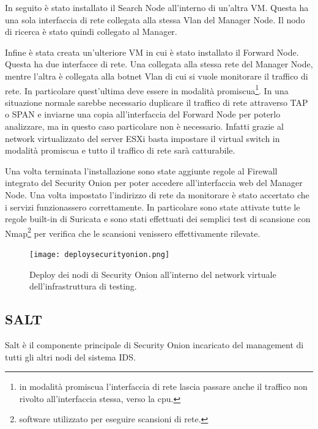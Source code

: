 In seguito è stato installato il Search Node all'interno di un'altra VM. Questa ha una sola interfaccia di rete collegata alla stessa Vlan del Manager Node. Il nodo di ricerca è stato quindi collegato al Manager.

Infine è stata creata un'ulteriore VM in cui è stato installato il Forward Node. Questa ha due interfacce di rete. Una collegata alla stessa rete del Manager Node, mentre l'altra è collegata alla botnet Vlan di cui si vuole monitorare il traffico di rete. In particolare quest'ultima deve essere in modalità promiscua\footnote{in modalità promiscua l'interfaccia di rete lascia passare anche il traffico non rivolto all'interfaccia stessa, verso la cpu.}.
In una situazione normale sarebbe necessario duplicare il traffico di rete attraverso TAP o SPAN e inviarne una copia all'interfaccia del Forward Node per poterlo analizzare, ma in questo caso particolare non è necessario. Infatti grazie al network virtualizzato del server ESXi basta impostare il virtual switch in modalità promiscua e tutto il traffico di rete sarà catturabile.

Una volta terminata l'installazione sono state aggiunte regole al Firewall integrato del Security Onion per poter accedere all'interfaccia web del Manager Node. 
Una volta impostato l'indirizzo di rete da monitorare è stato accertato che i servizi funzionassero correttamente.
In particolare sono state attivate tutte le regole built-in di Suricata e sono stati effettuati dei semplici test di scansione con Nmap\footnote{software utilizzato per eseguire scansioni di rete.} \cite{nmap}  per verifica che le scansioni venissero effettivamente  rilevate.


\begin{figure}[hbtp]
    \centering
    \texttt{[image: deploysecurityonion.png]}
    \caption{Deploy dei nodi di Security Onion all'interno del network virtuale dell'infrastruttura di testing.}
    \label{fig:deploysecurityonion}
\end{figure}

\subsection{SALT}


Salt \cite{salt} è il componente principale di Security Onion incaricato del management di tutti gli altri nodi del sistema  IDS.

